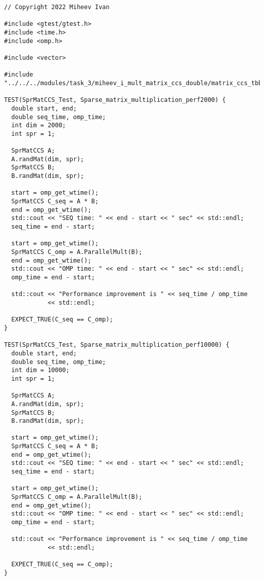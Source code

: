 \documentclass{report}
\begin{document}
\begin{lstlisting}
// Copyright 2022 Miheev Ivan

#include <gtest/gtest.h>
#include <time.h>
#include <omp.h>

#include <vector>

#include "../../../modules/task_3/miheev_i_mult_matrix_ccs_double/matrix_ccs_tbb.h"

TEST(SprMatCCS_Test, Sparse_matrix_multiplication_perf2000) {
  double start, end;
  double seq_time, omp_time;
  int dim = 2000;
  int spr = 1;

  SprMatCCS A;
  A.randMat(dim, spr);
  SprMatCCS B;
  B.randMat(dim, spr);

  start = omp_get_wtime();
  SprMatCCS C_seq = A * B;
  end = omp_get_wtime();
  std::cout << "SEQ time: " << end - start << " sec" << std::endl;
  seq_time = end - start;

  start = omp_get_wtime();
  SprMatCCS C_omp = A.ParallelMult(B);
  end = omp_get_wtime();
  std::cout << "OMP time: " << end - start << " sec" << std::endl;
  omp_time = end - start;

  std::cout << "Performance improvement is " << seq_time / omp_time
            << std::endl;

  EXPECT_TRUE(C_seq == C_omp);
}

TEST(SprMatCCS_Test, Sparse_matrix_multiplication_perf10000) {
  double start, end;
  double seq_time, omp_time;
  int dim = 10000;
  int spr = 1;

  SprMatCCS A;
  A.randMat(dim, spr);
  SprMatCCS B;
  B.randMat(dim, spr);

  start = omp_get_wtime();
  SprMatCCS C_seq = A * B;
  end = omp_get_wtime();
  std::cout << "SEQ time: " << end - start << " sec" << std::endl;
  seq_time = end - start;

  start = omp_get_wtime();
  SprMatCCS C_omp = A.ParallelMult(B);
  end = omp_get_wtime();
  std::cout << "OMP time: " << end - start << " sec" << std::endl;
  omp_time = end - start;

  std::cout << "Performance improvement is " << seq_time / omp_time
            << std::endl;

  EXPECT_TRUE(C_seq == C_omp);
}
\end{lstlisting}
\end{document}
